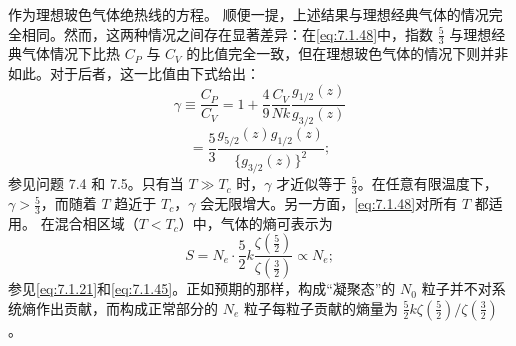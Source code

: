 作为理想玻色气体绝热线的方程。
顺便一提，上述结果与理想经典气体的情况完全相同。然而，这两种情况之间存在显著差异：在\autoref{eq:7.1.48}中，指数 \(\frac{5}{3}\) 与理想经典气体情况下比热 \(C_{P}\) 与 \(C_{V}\) 的比值完全一致，但在理想玻色气体的情况下则并非如此。对于后者，这一比值由下式给出：
\begin{equation}\tag{7.1.49}\label{eq:7.1.49}
\gamma \equiv \frac { C _ { P } } { C _ { V } } = 1 + \frac { 4 } { 9 } \frac { C _ { V } } { N k } \frac { g _ { 1 / 2 } ( z ) } { g _ { 3 / 2 } ( z ) }
\end{equation}
\begin{equation}\tag{7.1.50}\label{eq:7.1.50}
= \frac { 5 } { 3 } \frac { g _ { 5 / 2 } ( z ) g _ { 1 / 2 } ( z ) } { \{ g _ { 3 / 2 } ( z ) \} ^{2} } ;
\end{equation}
参见问题 7.4 和 7.5。只有当 \(T \gg T_c\) 时，\(\gamma\) 才近似等于 \(\frac{5}{3}\)。在任意有限温度下，\(\gamma > \frac{5}{3}\)，而随着 \(T\) 趋近于 \(T_c\)，\(\gamma\) 会无限增大。另一方面，\autoref{eq:7.1.48}对所有 \(T\) 都适用。
在混合相区域（\(T < T_{c}\)）中，气体的熵可表示为
\begin{equation}\tag{7.1.51}\label{eq:7.1.51}
S = N _ { e } \cdot \frac { 5 } { 2 } k \frac { \zeta \left( \frac { 5 } { 2 } \right) } { \zeta \left( \frac { 3 } { 2 } \right) } \propto N _ { e } ;
\end{equation}
参见\autoref{eq:7.1.21}和\autoref{eq:7.1.45}。正如预期的那样，构成“凝聚态”的 \(N_{0}\) 粒子并不对系统熵作出贡献，而构成正常部分的 \(N_{e}\) 粒子每粒子贡献的熵量为 \(\frac{5}{2}k\zeta(\frac{5}{2})/\zeta(\frac{3}{2})\)。
